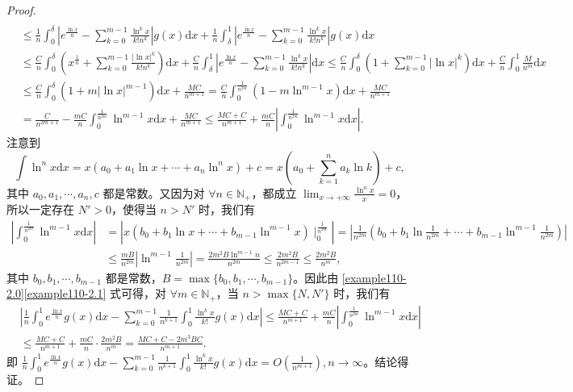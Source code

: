 \documentclass[../../main.tex]{subfiles}
\begin{document}
\begin{proof}
\begin{align}
\\
&\leqslant \frac{1}{n}\int_0^{\delta}{\left| e^{\frac{\ln x}{n}}-\sum_{k=0}^{m-1}{\frac{\ln ^kx}{k!n^k}} \right|g\left( x \right) \mathrm{d}x}+\frac{1}{n}\int_{\delta}^1{\left| e^{\frac{\ln x}{n}}-\sum_{k=0}^{m-1}{\frac{\ln ^kx}{k!n^k}} \right|g\left( x \right) \mathrm{d}x}
\nonumber
\\
&\leqslant \frac{C}{n}\int_0^{\delta}{\left( x^{\frac{1}{n}}+\sum_{k=0}^{m-1}{\frac{\left| \ln x \right|^k}{k!n^k}} \right) \mathrm{d}x}+\frac{C}{n}\int_{\delta}^1{\left| e^{\frac{\ln x}{n}}-\sum_{k=0}^{m-1}{\frac{\ln ^kx}{k!n^k}} \right|\mathrm{d}x}\leqslant \frac{C}{n}\int_0^{\delta}{\left( 1+\sum_{k=0}^{m-1}{\left| \ln x \right|^k} \right) \mathrm{d}x}+\frac{C}{n}\int_0^1{\frac{M}{n^m}\mathrm{d}x}
\nonumber
\\
&\leqslant \frac{C}{n}\int_0^{\delta}{\left( 1+m\left| \ln x \right|^{m-1} \right) \mathrm{d}x}+\frac{MC}{n^{m+1}}=\frac{C}{n}\int_0^{\frac{1}{n^{2m}}}{\left( 1-m\ln ^{m-1}x \right) \mathrm{d}x}+\frac{MC}{n^{m+1}}
\nonumber
\\
&=\frac{C}{n^{2m+1}}-\frac{mC}{n}\int_0^{\frac{1}{n^{2m}}}{\ln ^{m-1}x\mathrm{d}x}+\frac{MC}{n^{m+1}}\leqslant \frac{MC+C}{n^{m+1}}+\frac{mC}{n}\left| \int_0^{\frac{1}{n^{2m}}}{\ln ^{m-1}x\mathrm{d}x} \right|.\label{example110-2.0}
\end{align}
注意到
\[
\int\ln^n x\mathrm{d}x=x\left(a_0 + a_1\ln x+\cdots + a_n\ln^n x\right)+c=x\left(a_0+\sum_{k = 1}^{n}a_k\ln k\right)+c,
\]
其中 \(a_0,a_1,\cdots,a_n,c\) 都是常数。又因为对 \(\forall n\in\mathbb{N}_+\)，都成立 \(\lim_{x\rightarrow +\infty}\frac{\ln^n x}{x}=0\)，所以一定存在 \(N'>0\)，使得当 \(n > N'\) 时，我们有
\begin{align}
\left| \int_0^{\frac{1}{n^{2m}}}{\ln ^{m-1}x\mathrm{d}x} \right|&=\left| x\left( b_0+b_1\ln x+\cdots +b_{m-1}\ln ^{m-1}x \right) \mid_{0}^{\frac{1}{n^{2m}}} \right|=\left| \frac{1}{n^{2m}}\left( b_0+b_1\ln \frac{1}{n^{2m}}+\cdots +b_{m-1}\ln ^{m-1}\frac{1}{n^{2m}} \right) \right|
\nonumber
\\
&\leqslant \frac{mB}{n^{2m}}\left| \ln ^{m-1}\frac{1}{n^{2m}} \right|=\frac{2m^2B\ln ^{m-1}n}{n^{2m}}\leqslant \frac{2m^2B}{n^{2m-1}}\leqslant \frac{2m^2B}{n^m},\label{example110-2.1}
\end{align}
其中 \(b_0,b_1,\cdots,b_{m - 1}\) 都是常数，\(B = \max\{b_0,b_1,\cdots,b_{m - 1}\}\)。因此由 \eqref{example110-2.0}\eqref{example110-2.1} 式可得，对 \(\forall m\in\mathbb{N}_+\)，当 \(n>\max\{N,N'\}\) 时，我们有
\begin{align*}
&\left|\frac{1}{n}\int_{0}^{1}e^{\frac{\ln x}{n}}g(x)\mathrm{d}x-\sum_{k = 0}^{m - 1}\frac{1}{n^{k + 1}}\int_{0}^{1}\frac{\ln^k x}{k!}g(x)\mathrm{d}x\right|
\leqslant\frac{MC + C}{n^{m + 1}}+\frac{mC}{n}\left|\int_{0}^{\frac{1}{n^{2m}}}\ln^{m - 1}x\mathrm{d}x\right|
\\
&\leqslant\frac{MC + C}{n^{m + 1}}+\frac{mC}{n}\cdot\frac{2m^2B}{n^m}
=\frac{MC + C-2m^3BC}{n^{m + 1}}.
\end{align*}
即 \(\frac{1}{n}\int_{0}^{1}e^{\frac{\ln x}{n}}g(x)\mathrm{d}x-\sum_{k = 0}^{m - 1}\frac{1}{n^{k + 1}}\int_{0}^{1}\frac{\ln^k x}{k!}g(x)\mathrm{d}x=O\left(\frac{1}{n^{m + 1}}\right),n\rightarrow\infty\)。结论得证。
\end{proof}
\end{document}
